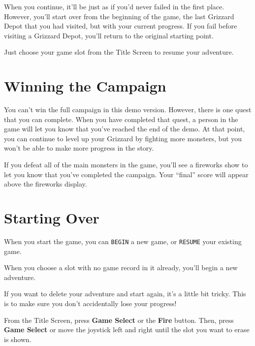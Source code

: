 \documentclass[10pt,twocolumn,openany,article]{memoir}
\begin{document}
\begin{description}
When you continue, it'll  be just as if you'd never  failed in the first
place. However,  you'll start over from  \ifdefined\NOSAVE the beginning
of the game, \else the last Grizzard Depot that you had visited, \fi but
with your  current progress.  \ifdefined\NOSAVE\else If you  fail before
visiting a Grizzard Depot, you'll return to the original starting point.
\fi

Just  choose   your  game   slot  from  the   Title  Screen   to  resume
your adventure.

\section{Winning the Campaign}\label{Winning the Campaign}

\ifdefined\DEMO

You can't win the full campaign  in this demo version. However, there is
one quest  that you can  complete. When  you have completed  that quest,
a person in  the game will let  you know that you've reached  the end of
the demo. At that  point, you can continue to level  up your Grizzard by
fighting more monsters,  but you won't be able to  make more progress in
the story.

\else

If  you  defeat  all of  the  main  monsters  in  the game,  you'll  see
a fireworks  show to let  you know  that you've completed  the campaign.
Your ``final'' score will appear above the fireworks display.

\fi

\section{Starting Over}\label{Starting Your Adventure Over}

\ifdefined\NOSAVE

When  you  start  the  game,  you can  \texttt{BEGIN}  a  new  game,  or
\texttt{RESUME} your existing game.

\else

When you choose a  slot with no game record in  it already, you'll begin
a new adventure.

If you want to delete your adventure  and start again, it's a little bit
tricky. This is to make sure you don't accidentally lose your progress!

From the  Title Screen, press  \textbf{Game Select} or the  \textbf{Fire} button.
Then, press  \textbf{Game Select}  or move the  joystick left  and right
until the slot you want to erase is shown.


\end{description}
\end{document}
